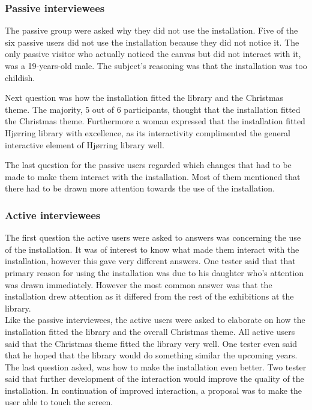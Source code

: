\subsubsection{Passive interviewees}
The passive group were asked why they did not use the installation. Five of the six passive users did not use the installation because they did not notice it. The only passive visitor who actually noticed the canvas but did not interact with it, was a 19-years-old male. The subject's reasoning was that the installation was too childish. 

Next question was how the installation fitted the library and the Christmas theme. The majority, 5 out of 6 participants, thought that the installation fitted the Christmas theme. Furthermore a woman expressed that the installation fitted Hj{\o}rring library with excellence, as its interactivity complimented the general interactive element of Hj{\o}rring library well. 

The last question for the passive users regarded which changes that had to be made to make them interact with the installation. Most of them mentioned that there had to be drawn more attention towards the use of the installation.


\subsubsection{Active interviewees}
The first question the active users were asked to answers was concerning the use of the installation. It was of interest to know what made them interact with the installation, however this gave very different answers. One tester said that that primary reason for using the installation was due to his daughter who's attention was drawn immediately. However the most common answer was that the installation drew attention as it differed from the rest of the exhibitions at the library.\\
Like the passive interviewees, the active users were asked to elaborate on how the installation fitted the library and the overall Christmas theme. All active users said that the Christmas theme fitted the library very well. One tester even said that he hoped that the library would do something similar the upcoming years.\\
The last question asked, was how to make the installation even better. Two tester said that further development of the interaction would improve the quality of the installation. In continuation of improved interaction, a proposal was to make the user able to touch the screen.